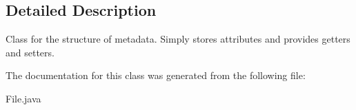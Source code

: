 \subsection{Detailed Description}
Class for the structure of metadata. Simply stores attributes and provides getters and setters. 

The documentation for this class was generated from the following file\+:\begin{DoxyCompactItemize}
\item 
File.\+java\end{DoxyCompactItemize}
